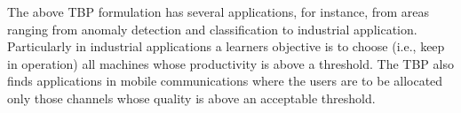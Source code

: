 The above TBP formulation has several 
applications, for instance, from areas ranging from anomaly detection and classification \cite{locatelli2016optimal} to industrial application. Particularly in industrial applications a learners objective is to choose (i.e., keep in  operation) all machines whose productivity is above a threshold. The TBP also finds applications in mobile communications \cite{audibert2010best}  where the users are to be allocated only those channels whose quality is above an acceptable threshold.

%
%
%
%
%